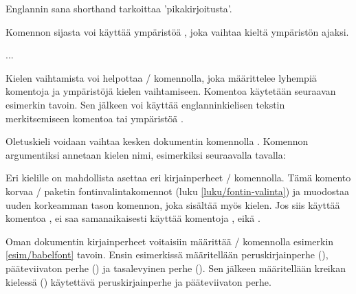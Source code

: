 \begin{koodilohkosis}
Englannin sana \foreignlanguage{english}{shorthand} tarkoittaa
'pikakirjoitusta'.
\end{koodilohkosis}

\noindent
Komennon sijasta voi käyttää ympäristöä , joka
vaihtaa kieltä ympäristön ajaksi.

\begin{koodilohkosis}
\begin{otherlanguage}{greek}
  ...
\end{otherlanguage}
\end{koodilohkosis}

\noindent
Kielen vaihtamista voi helpottaa \-/ komennolla, joka
määrittelee lyhempiä komentoja ja ympäristöjä kielen vaihtamiseen.
Komentoa käytetään seuraavan esimerkin tavoin. Sen jälkeen voi käyttää
englanninkielisen tekstin merkitsemiseen komentoa 
tai ympäristöä .

\begin{koodilohkosis}
\end{koodilohkosis}

\noindent
Oletuskieli voidaan vaihtaa kesken dokumentin komennolla
. Komennon argumentiksi annetaan kielen nimi,
esimerkiksi seuraavalla tavalla:

\begin{koodilohkosis}
\end{koodilohkosis}

\noindent
Eri kielille on mahdollista asettaa eri kirjainperheet
\-/ komennolla. Tämä komento korvaa
\-/ paketin fontinvalintakomennot (luku
\ref{luku/fontin-valinta}) ja muodostaa uuden korkeamman tason komennon,
joka sisältää myös kielen. Jos siis käyttää komentoa
, ei saa samanaikaisesti käyttää komentoja
,  eikä .

Oman dokumentin kirjainperheet voitaisiin määrittää
\-/ komennolla esimerkin \ref{esim/babelfont} tavoin.
Ensin esimerkissä määritellään peruskirjainperhe (),
pääteviivaton perhe () ja tasalevyinen perhe (). Sen
jälkeen määritellään kreikan kielessä () käytettävä
peruskirjainperhe ja pääteviivaton perhe.

